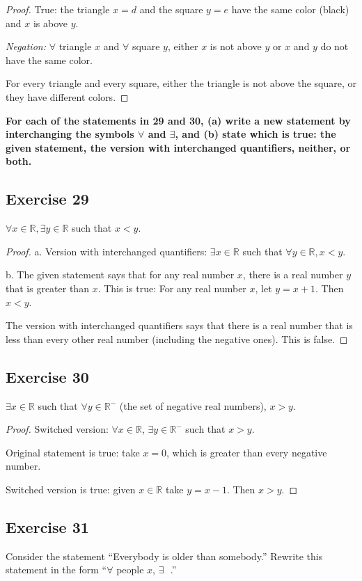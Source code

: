 \documentclass[14pt]{extarticle}
\newcommand{\fbl}{\underline{\hspace{1cm}}\,\,}
\newcommand{\R}{\mathbb{R}}
\newcommand{\fa}{\forall}
\newcommand{\te}{\exists}
\begin{document}
\begin{proof}
True: the triangle $x = d$ and the square $y = e$ have the same color (black) and $x$ is above $y$.

{\it Negation:} $\fa$ triangle $x$ and $\fa$ square $y$, either $x$ is not above $y$ or $x$ and $y$ do not have the same color.

For every triangle and every square, either the triangle is not above the square, or they have different colors.
\end{proof}

{\bf \color{cyan} For each of the statements in 29 and 30, (a) write a new statement by interchanging the symbols $\fa$ and $\te$, and (b) state which is true: the given statement, the version with interchanged quantifiers, neither, or both.}

\subsection{Exercise 29}
$\fa x \in \R, \te y \in \R$ such that $x < y$.

\begin{proof}
a. Version with interchanged quantifiers: $\te x \in \R$ such that $\fa y \in \R, x < y.$

b. The given statement says that for any real number $x$,
there is a real number $y$ that is greater than $x$. This
is true: For any real number $x$, let $y = x + 1$. Then
$x < y$. 

The version with interchanged quantifiers says that there is a real number that is less than every other real number (including the negative ones). This is false.
\end{proof}

\subsection{Exercise 30}
$\te x \in \R$ such that $\fa y \in \R^-$ (the set of negative real numbers), $x > y$.

\begin{proof}
Switched version: $\fa x \in \R$, $\te y \in \R^-$ such that $x > y$.

Original statement is true: take $x = 0$, which is greater than every negative number.

Switched version is true: given $x \in \R$ take $y = x - 1$. Then $x > y$.
\end{proof}

\subsection{Exercise 31}
Consider the statement “Everybody is older than somebody.” Rewrite this statement in the form “$\fa$ people $x$, $\te$ \fbl.”
\end{document}
